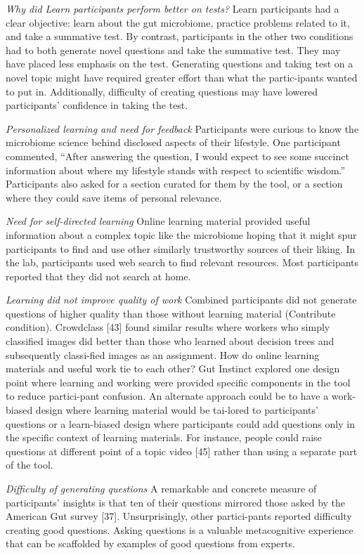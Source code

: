 \textit{Why did Learn participants perform better on tests?}
Learn participants had a clear objective: learn about the gut microbiome, practice problems related to it, and take a summative test. By contrast, participants in the other two conditions had to both generate novel questions and take the summative test. They may have placed less emphasis on the test. Generating questions and taking test on a novel topic might have required greater effort than what the partic-ipants wanted to put in. Additionally, difficulty of creating questions may have lowered participants’ confidence in taking the test. 

\textit{Personalized learning and need for feedback}
Participants were curious to know the microbiome science behind disclosed aspects of their lifestyle. One participant commented, “After answering the question, I would expect to see some succinct information about where my lifestyle stands with respect to scientific wisdom.” Participants also asked for a section curated for them by the tool, or a section where they could save items of personal relevance.
 
\textit{Need for self-directed learning}
Online learning material provided useful information about a complex topic like the microbiome hoping that it might spur participants to find and use other similarly trustworthy sources of their liking. In the lab, participants used web search to find relevant resources. Most participants reported that they did not search at home. 

\textit{Learning did not improve quality of work}
Combined participants did not generate questions of higher quality than those without learning material (Contribute condition). Crowdclass [43] found similar results where workers who simply classified images did better than those who learned about decision trees and subsequently classi-fied images as an assignment. How do online learning materials and useful work tie to each other? Gut Instinct explored one design point where learning and working were provided specific components in the tool to reduce partici-pant confusion. An alternate approach could be to have a work-biased design where learning material would be tai-lored to participants’ questions or a learn-biased design where participants could add questions only in the specific context of learning materials. For instance, people could raise questions at different point of a topic video [45] rather than using a separate part of the tool.
 
\textit{Difficulty of generating questions}
A remarkable and concrete measure of participants’ insights is that ten of their questions mirrored those asked by the American Gut survey [37]. Unsurprisingly, other partici-pants reported difficulty creating good questions. Asking questions is a valuable metacognitive experience that can be scaffolded by examples of good questions from experts. 

